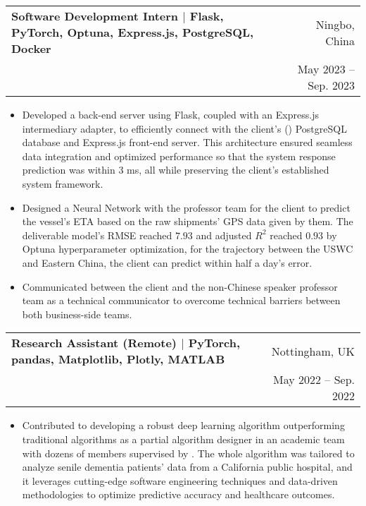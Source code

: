 \documentclass[letterpaper,10pt]{article}
\makeatletter
\newcommand{\link}[1]{\color{myBlue}{#1}}
\newcommand{\skill}[1]{\small{\textnormal{$|$ {#1}}}}
\newcommand{\resumeItem}[1]{
  \item\small{
    {#1 \vspace{-2pt}}
  }
}
\newcommand{\resumeSubheading}[4]{
  \vspace{-2pt}\item
    \begin{tabular*}{0.97\textwidth}[t]{l@{\extracolsep{\fill}}r}
      \textbf{#1} & #2 \\
      \small#3 & \small #4 \\
    \end{tabular*}\vspace{-7pt}
}
\newcommand{\resumeItemListStart}{\begin{itemize}}
\newcommand{\resumeItemListEnd}{\end{itemize}\vspace{-5pt}}
\makeatother
\begin{document}
    \resumeSubheading
      {Software Development Intern \skill{Flask, PyTorch, Optuna, Express.js, PostgreSQL, Docker}}{Ningbo, China}
      {\href{https://scale.mit.edu/centers/ningbo-china-institute-supply-chain-innovation}{\link{MIT Global SCALE Network}}}{May 2023 -- Sep. 2023}
      
      \resumeItemListStart
        \resumeItem{Developed a back-end server using Flask, coupled with an Express.js intermediary adapter, to efficiently connect with the client's (\href{https://www.jusdausa.com/}{\link{Jusda}}) PostgreSQL database and Express.js front-end server. This architecture ensured seamless data integration and optimized performance so that the system response prediction was within 3 ms, all while preserving the client's established system framework.}
        \resumeItem{Designed a Neural Network with the professor team for the client to predict the vessel's ETA based on the raw shipments' GPS data given by them. The deliverable model's RMSE reached $7.93$ and adjusted $R^2$ reached $0.93$ by Optuna hyperparameter optimization, for the trajectory between the USWC and Eastern China, the client can predict within half a day's error.}
        \resumeItem{Communicated between the client and the non-Chinese speaker professor team as a technical communicator to overcome technical barriers between both business-side teams.}
      \resumeItemListEnd
      
    \resumeSubheading
      {Research Assistant (Remote) \skill{PyTorch, pandas, Matplotlib, Plotly, MATLAB}}{Nottingham, UK}
      {\href{https://minghsiehece.usc.edu/}{\link{University of Southern California}}}{May 2022 -- Sep. 2022}
      \resumeItemListStart
        \resumeItem{Contributed to developing a robust deep learning algorithm outperforming traditional algorithms as a partial algorithm designer in an academic team with dozens of members supervised by \href{https://minghsiehece.usc.edu/directory/faculty/profile/?lname=Bogdan&fname=Paul}{\link{Professor Paul Bogdan}}. The whole algorithm was tailored to analyze senile dementia patients' data from a California public hospital, and it leverages cutting-edge software engineering techniques and data-driven methodologies to optimize predictive accuracy and healthcare outcomes.}
    \resumeItemListEnd
        
\end{document}
